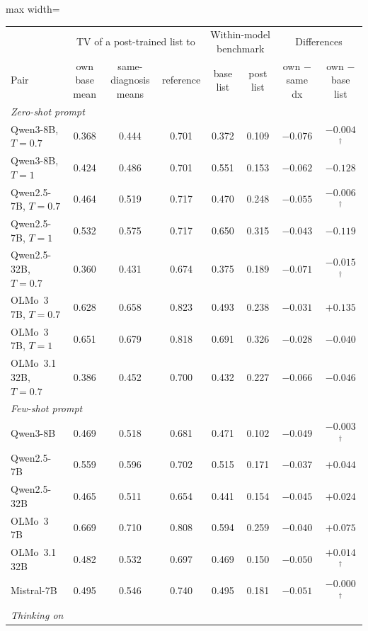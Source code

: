 \documentclass[wcp]{jmlr}
\begin{document}
\begin{table}[t]
\centering\small
\begin{adjustbox}{max width=\linewidth}
\begin{tabular}{lccccccc}
\toprule
 & \multicolumn{3}{c}{TV of a post-trained list to} & \multicolumn{2}{c}{Within-model benchmark} & \multicolumn{2}{c}{Differences} \\
Pair & own base mean & same-diagnosis means & reference & base list & post list & own $-$ same dx & own $-$ base list \\
\midrule
\multicolumn{8}{l}{\emph{Zero-shot prompt}} \\
Qwen3-8B, $T{=}0.7$ & 0.368 & 0.444 & 0.701 & 0.372 & 0.109 & $-0.076$ & $-0.004$$^{\dagger}$ \\
Qwen3-8B, $T{=}1$ & 0.424 & 0.486 & 0.701 & 0.551 & 0.153 & $-0.062$ & $-0.128$ \\
Qwen2.5-7B, $T{=}0.7$ & 0.464 & 0.519 & 0.717 & 0.470 & 0.248 & $-0.055$ & $-0.006$$^{\dagger}$ \\
Qwen2.5-7B, $T{=}1$ & 0.532 & 0.575 & 0.717 & 0.650 & 0.315 & $-0.043$ & $-0.119$ \\
Qwen2.5-32B, $T{=}0.7$ & 0.360 & 0.431 & 0.674 & 0.375 & 0.189 & $-0.071$ & $-0.015$$^{\dagger}$ \\
OLMo~3 7B, $T{=}0.7$ & 0.628 & 0.658 & 0.823 & 0.493 & 0.238 & $-0.031$ & $+0.135$ \\
OLMo~3 7B, $T{=}1$ & 0.651 & 0.679 & 0.818 & 0.691 & 0.326 & $-0.028$ & $-0.040$ \\
OLMo~3.1 32B, $T{=}0.7$ & 0.386 & 0.452 & 0.700 & 0.432 & 0.227 & $-0.066$ & $-0.046$ \\
\midrule
\multicolumn{8}{l}{\emph{Few-shot prompt}} \\
Qwen3-8B & 0.469 & 0.518 & 0.681 & 0.471 & 0.102 & $-0.049$ & $-0.003$$^{\dagger}$ \\
Qwen2.5-7B & 0.559 & 0.596 & 0.702 & 0.515 & 0.171 & $-0.037$ & $+0.044$ \\
Qwen2.5-32B & 0.465 & 0.511 & 0.654 & 0.441 & 0.154 & $-0.045$ & $+0.024$ \\
OLMo~3 7B & 0.669 & 0.710 & 0.808 & 0.594 & 0.259 & $-0.040$ & $+0.075$ \\
OLMo~3.1 32B & 0.482 & 0.532 & 0.697 & 0.469 & 0.150 & $-0.050$ & $+0.014$$^{\dagger}$ \\
Mistral-7B & 0.495 & 0.546 & 0.740 & 0.495 & 0.181 & $-0.051$ & $-0.000$$^{\dagger}$ \\
\midrule
\multicolumn{8}{l}{\emph{Thinking on}} \\

\end{tabular}
\end{adjustbox}
\end{table}
\end{document}
